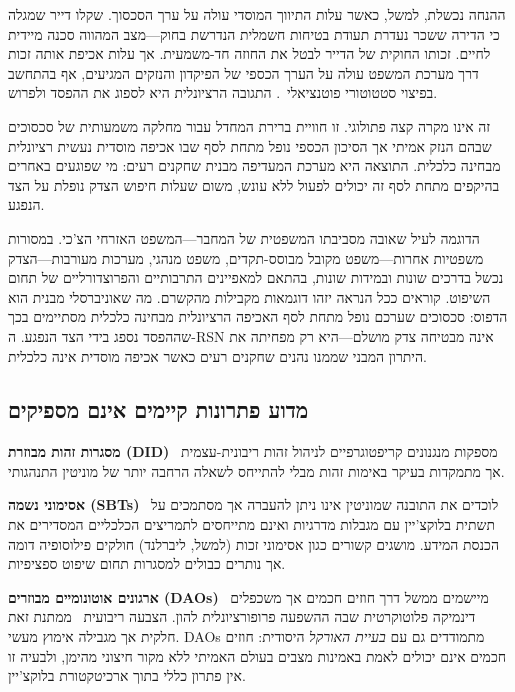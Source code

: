 \documentclass[11pt,a4paper,twocolumn]{article}
\begin{document}
ההנחה נכשלת, למשל, כאשר עלות התיווך המוסדי עולה על ערך הסכסוך. שקלו דייר שמגלה כי הדירה ששכר נעדרת תעודת בטיחות חשמלית הנדרשת בחוק---מצב המהווה סכנה מיידית לחיים. זכותו החוקית של הדייר לבטל את החוזה חד-משמעית. אך עלות אכיפת אותה זכות דרך מערכת המשפט עולה על הערך הכספי של הפיקדון והנזקים המגיעים, אף בהתחשב בפיצוי סטטוטורי פוטנציאלי~\cite{czcourtfees}. התגובה הרציונלית היא לספוג את ההפסד ולפרוש.

זה אינו מקרה קצה פתולוגי. זו חוויית ברירת המחדל עבור מחלקה משמעותית של סכסוכים שבהם הנזק אמיתי אך הסיכון הכספי נופל מתחת לסף שבו אכיפה מוסדית נעשית רציונלית מבחינה כלכלית. התוצאה היא מערכת המעדיפה מבנית שחקנים רעים: מי שפוגעים באחרים בהיקפים מתחת לסף זה יכולים לפעול ללא עונש, משום שעלות חיפוש הצדק נופלת על הצד הנפגע.

הדוגמה לעיל שאובה מסביבתו המשפטית של המחבר---המשפט האזרחי הצ'כי. במסורות משפטיות אחרות---משפט מקובל מבוסס-תקדים, משפט מנהגי, מערכות מעורבות---הצדק נכשל בדרכים שונות ובמידות שונות, בהתאם למאפיינים התרבותיים והפרוצדורליים של תחום השיפוט. קוראים ככל הנראה יזהו דוגמאות מקבילות מהקשרם. מה שאוניברסלי מבנית הוא הדפוס: סכסוכים שערכם נופל מתחת לסף האכיפה הרציונלית מבחינה כלכלית מסתיימים בכך שההפסד נספג בידי הצד הנפגע. ה-RSN אינה מבטיחה צדק מושלם---היא רק מפחיתה את היתרון המבני שממנו נהנים שחקנים רעים כאשר אכיפה מוסדית אינה כלכלית.

\subsection{מדוע פתרונות קיימים אינם מספיקים}

\textbf{מסגרות זהות מבוזרת (DID)}~\cite{did2022} מספקות מנגנונים קריפטוגרפיים לניהול זהות ריבונית-עצמית אך מתמקדות בעיקר באימות זהות מבלי להתייחס לשאלה הרחבה יותר של מוניטין התנהגותי.

\textbf{אסימוני נשמה (SBTs)}~\cite{weyl2022} לוכדים את התובנה שמוניטין אינו ניתן להעברה אך מסתמכים על תשתית בלוקצ'יין עם מגבלות מדרגיות ואינם מתייחסים לתמריצים הכלכליים המסדירים את הכנסת המידע. מושגים קשורים כגון אסימוני זכות (למשל, ליברלנד) חולקים פילוסופיה דומה אך נותרים כבולים למסגרות תחום שיפוט ספציפיות.

\textbf{ארגונים אוטונומיים מבוזרים (DAOs)}~\cite{buterin2014} מיישמים ממשל דרך חוזים חכמים אך משכפלים דינמיקה פלוטוקרטית שבה ההשפעה פרופורציונלית להון. הצבעה ריבועית~\cite{buterin2019} ממתנת זאת חלקית אך מגבילה אימוץ מעשי. DAOs מתמודדים גם עם \emph{בעיית האורקל} היסודית: חוזים חכמים אינם יכולים לאמת באמינות מצבים בעולם האמיתי ללא מקור חיצוני מהימן, ולבעיה זו אין פתרון כללי בתוך ארכיטקטורת בלוקצ'יין.
\end{document}
